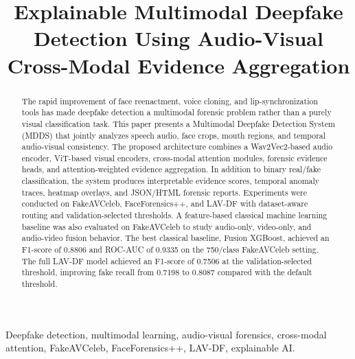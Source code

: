 \documentclass[conference]{IEEEtran}
\begin{document}
\title{Explainable Multimodal Deepfake Detection Using Audio-Visual Cross-Modal Evidence Aggregation}

\author{
}

\maketitle

\begin{abstract}
The rapid improvement of face reenactment, voice cloning, and lip-synchronization tools has made deepfake detection a multimodal forensic problem rather than a purely visual classification task. This paper presents a Multimodal Deepfake Detection System (MDDS) that jointly analyzes speech audio, face crops, mouth regions, and temporal audio-visual consistency. The proposed architecture combines a Wav2Vec2-based audio encoder, ViT-based visual encoders, cross-modal attention modules, forensic evidence heads, and attention-weighted evidence aggregation. In addition to binary real/fake classification, the system produces interpretable evidence scores, temporal anomaly traces, heatmap overlays, and JSON/HTML forensic reports. Experiments were conducted on FakeAVCeleb, FaceForensics++, and LAV-DF with dataset-aware routing and validation-selected thresholds. A feature-based classical machine learning baseline was also evaluated on FakeAVCeleb to study audio-only, video-only, and audio-video fusion behavior. The best classical baseline, Fusion XGBoost, achieved an F1-score of 0.8806 and ROC-AUC of 0.9335 on the 750/class FakeAVCeleb setting. The full LAV-DF model achieved an F1-score of 0.7506 at the validation-selected threshold, improving fake recall from 0.7198 to 0.8087 compared with the default threshold.
\end{abstract}

\begin{IEEEkeywords}
Deepfake detection, multimodal learning, audio-visual forensics, cross-modal attention, FakeAVCeleb, FaceForensics++, LAV-DF, explainable AI.
\end{IEEEkeywords}
\end{document}
